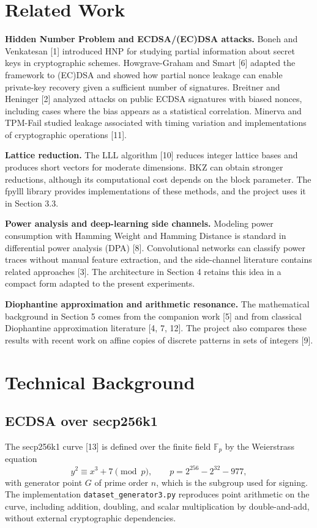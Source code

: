 \documentclass[11pt,a4paper]{article}
\begin{document}
\section{Related Work}

\textbf{Hidden Number Problem and ECDSA/(EC)DSA attacks.}
Boneh and Venkatesan [1] introduced HNP for studying partial information about secret keys in cryptographic schemes. Howgrave-Graham and Smart [6] adapted the framework to (EC)DSA and showed how partial nonce leakage can enable private-key recovery given a sufficient number of signatures. Breitner and Heninger [2] analyzed attacks on public ECDSA signatures with biased nonces, including cases where the bias appears as a statistical correlation. Minerva and TPM-Fail studied leakage associated with timing variation and implementations of cryptographic operations [11].

\textbf{Lattice reduction.}
The LLL algorithm [10] reduces integer lattice bases and produces short vectors for moderate dimensions. BKZ can obtain stronger reductions, although its computational cost depends on the block parameter. The fpylll library provides implementations of these methods, and the project uses it in Section 3.3.

\textbf{Power analysis and deep-learning side channels.}
Modeling power consumption with Hamming Weight and Hamming Distance is standard in differential power analysis (DPA) [8]. Convolutional networks can classify power traces without manual feature extraction, and the side-channel literature contains related approaches [3]. The architecture in Section 4 retains this idea in a compact form adapted to the present experiments.

\textbf{Diophantine approximation and arithmetic resonance.}
The mathematical background in Section 5 comes from the companion work [5] and from classical Diophantine approximation literature [4, 7, 12]. The project also compares these results with recent work on affine copies of discrete patterns in sets of integers [9].

\section{Technical Background}

\subsection{ECDSA over secp256k1}

The secp256k1 curve [13] is defined over the finite field $\mathbb F_p$ by the Weierstrass equation
\[
y^2\equiv x^3+7\pmod p,
\qquad
p=2^{256}-2^{32}-977,
\]
with generator point $G$ of prime order $n$, which is the subgroup used for signing. The implementation \texttt{dataset\_generator3.py} reproduces point arithmetic on the curve, including addition, doubling, and scalar multiplication by double-and-add, without external cryptographic dependencies.
\end{document}
